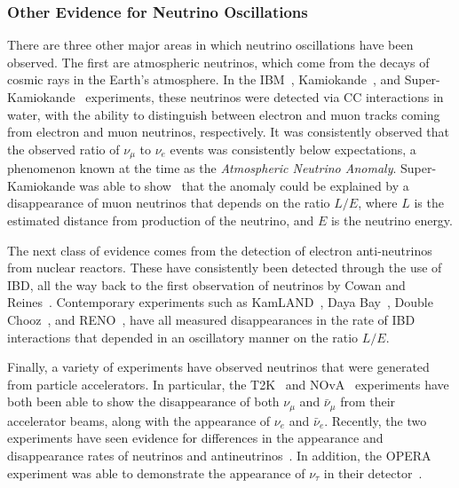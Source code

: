 \subsubsection{Other Evidence for Neutrino Oscillations}
There are three other major areas in which neutrino oscillations have been observed. The first are atmospheric neutrinos, which come from the decays of cosmic rays in the Earth's atmosphere. In the  IBM~\cite{becker-szendyElectronMuonneutrinoContent1992}, %
Kamiokande~\cite{fukudaAtmosphericVmveRatio1994}, %
and Super-Kamiokande~\cite{fukudaEvidenceOscillationAtmospheric1998} %
experiments, these neutrinos were detected via CC interactions in water, with the ability to distinguish between electron and muon tracks coming from electron and muon neutrinos, respectively. It was consistently observed that the observed ratio of $\nu_{\mu}$ to $\nu_{e}$ events was consistently below expectations, a phenomenon known at the time as the \textit{Atmospheric Neutrino Anomaly}. Super-Kamiokande was able to show~\cite{ashieEvidenceOscillatorySignature2004} that the anomaly could be explained by a disappearance of muon neutrinos that depends on the ratio $L/E$, where $L$ is the estimated distance from production of the neutrino, and $E$ is the neutrino energy.

The next class of evidence comes from the detection of electron anti-neutrinos from nuclear reactors. These have consistently been detected through the use of IBD, all the way back to the first observation of neutrinos by Cowan and Reines~\cite{cowanDetectionFreeNeutrino1956,reinesNeutrino1956}. Contemporary experiments such as KamLAND~\cite{gandoReactorOnoffAntineutrino2013}, Daya Bay~\cite{adeyMeasurementElectronAntineutrino2018}, Double Chooz~\cite{dekerretDoubleChoozTh132020}, and RENO~\cite{bakMeasurementReactorAntineutrino2018}, have all measured disappearances in the rate of IBD interactions that depended in an oscillatory manner on the ratio $L/E$.

Finally, a variety of experiments have observed neutrinos that were generated from particle accelerators. In particular, the T2K~\cite{abeImprovedConstraintsNeutrino2021,abeObservationElectronNeutrino2014} and NOvA~\cite{adamsonConstraintsOscillationParameters2017,adamsonFirstMeasurementElectron2016} experiments have both been able to show the disappearance of both $\nu_{\mu}$ and $\bar{\nu}_{\mu}$ from their accelerator beams, along with the appearance of $\nu_{e}$ and $\bar{\nu}_{e}$. Recently, the two experiments have seen evidence for differences in the appearance and disappearance rates of neutrinos and antineutrinos~\cite{abeConstraintMatterAntimatter2020,aceroFirstMeasurementNeutrino2019}. In addition, the OPERA experiment was able to demonstrate the appearance of $\nu_{\tau}$ in their detector~\cite{agafonovaFinalResultsOPERA2018}.

